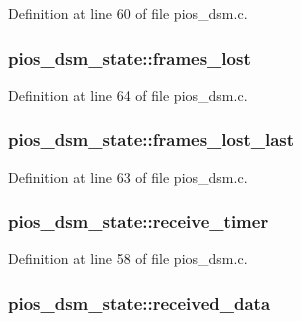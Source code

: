 Definition at line 60 of file pios\-\_\-dsm.\-c.

\hypertarget{structpios__dsm__state_ae3dfacd2e0da0bc8b4503054f854bfcc}{
\subsubsection[{frames\-\_\-lost}]{ pios\-\_\-dsm\-\_\-state\-::frames\-\_\-lost}}\label{structpios__dsm__state_ae3dfacd2e0da0bc8b4503054f854bfcc}


Definition at line 64 of file pios\-\_\-dsm.\-c.

\hypertarget{structpios__dsm__state_a427f6b8b7743f180403285623f71260e}{
\subsubsection[{frames\-\_\-lost\-\_\-last}]{ pios\-\_\-dsm\-\_\-state\-::frames\-\_\-lost\-\_\-last}}\label{structpios__dsm__state_a427f6b8b7743f180403285623f71260e}


Definition at line 63 of file pios\-\_\-dsm.\-c.

\hypertarget{structpios__dsm__state_af7296b9f7aa4be7e56a8edd0025c5fab}{
\subsubsection[{receive\-\_\-timer}]{ pios\-\_\-dsm\-\_\-state\-::receive\-\_\-timer}}\label{structpios__dsm__state_af7296b9f7aa4be7e56a8edd0025c5fab}


Definition at line 58 of file pios\-\_\-dsm.\-c.

\hypertarget{structpios__dsm__state_af4caef811fdc9b8381bedc715e92068e}{
\subsubsection[{received\-\_\-data}]{ pios\-\_\-dsm\-\_\-state\-::received\-\_\-data}}\label{structpios__dsm__state_af4caef811fdc9b8381bedc715e92068e}


